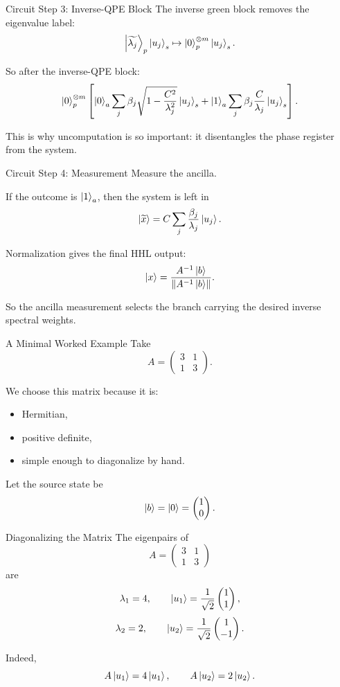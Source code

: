 \documentclass{beamer}
\begin{document}
\begin{frame}{Circuit Step 3: Inverse-QPE Block}
The inverse green block removes the eigenvalue label:
\[
\ket{\widetilde{\lambda_j}}_p \ket{u_j}_s
\mapsto
\ket{0}^{\otimes m}_p \ket{u_j}_s.
\]

So after the inverse-QPE block:
\[
\ket{0}^{\otimes m}_p
\left[
\ket{0}_a \sum_j \beta_j \sqrt{1-\frac{C^2}{\lambda_j^2}} \ket{u_j}_s
+
\ket{1}_a \sum_j \beta_j \frac{C}{\lambda_j}\ket{u_j}_s
\right].
\]

This is why uncomputation is so important: it disentangles the phase register from the system.
\end{frame}

\begin{frame}{Circuit Step 4: Measurement}
Measure the ancilla.

\medskip

If the outcome is \(\ket{1}_a\), then the system is left in
\[
\ket{\widetilde{x}} = C\sum_j \frac{\beta_j}{\lambda_j}\ket{u_j}.
\]

Normalization gives the final HHL output:
\[
\ket{x}=\frac{A^{-1}\ket{b}}{\norm{A^{-1}\ket{b}}}.
\]

So the ancilla measurement selects the branch carrying the desired inverse spectral weights.
\end{frame}



\begin{frame}{A Minimal Worked Example}
Take
\[
A=
\begin{pmatrix}
3 & 1\\
1 & 3
\end{pmatrix}.
\]

We choose this matrix because it is:
\begin{itemize}
    \item Hermitian,
    \item positive definite,
    \item simple enough to diagonalize by hand.
\end{itemize}

Let the source state be
\[
\ket{b}=\ket{0}
=
\begin{pmatrix}
1\\
0
\end{pmatrix}.
\]
\end{frame}

\begin{frame}{Diagonalizing the Matrix}
The eigenpairs of
\[
A=
\begin{pmatrix}
3 & 1\\
1 & 3
\end{pmatrix}
\]
are
\[
\lambda_1=4,
\qquad
\ket{u_1}=\frac{1}{\sqrt{2}}
\begin{pmatrix}
1\\
1
\end{pmatrix},
\]
\[
\lambda_2=2,
\qquad
\ket{u_2}=\frac{1}{\sqrt{2}}
\begin{pmatrix}
1\\
-1
\end{pmatrix}.
\]

Indeed,
\[
A\ket{u_1}=4\ket{u_1},
\qquad
A\ket{u_2}=2\ket{u_2}.
\]
\end{frame}
\end{document}
